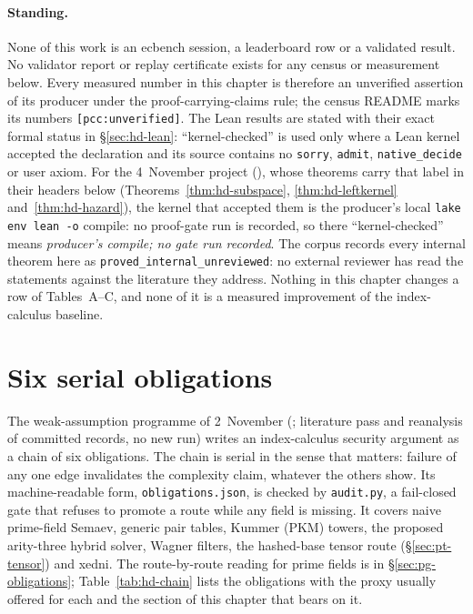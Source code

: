 \paragraph{Standing.} None of this work is an ecbench session, a leaderboard
row or a validated result. No validator report or replay certificate exists
for any census or measurement below. Every measured number in this chapter
is therefore an unverified assertion of its producer under the
proof-carrying-claims rule; the census README marks its numbers
\texttt{[pcc:unverified]}. The Lean results are stated with their exact
formal status in \S\ref{sec:hd-lean}: ``kernel-checked'' is used only where
a Lean kernel accepted the declaration and its source contains no
\texttt{sorry}, \texttt{admit}, \texttt{native\_decide} or user axiom. For the
4~November project (), whose theorems
carry that label in their headers below (Theorems~\ref{thm:hd-subspace},
\ref{thm:hd-leftkernel} and~\ref{thm:hd-hazard}), the kernel that accepted
them is the producer's local \texttt{lake env lean -o} compile: no
proof-gate run is recorded, so there ``kernel-checked'' means
\emph{producer's compile; no gate run recorded}. The
corpus records every internal theorem here as
\texttt{proved\_internal\_unreviewed}: no external reviewer has read the
statements against the literature they address. Nothing in this chapter
changes a row of Tables~A--C, and none of it is a measured improvement of the
index-calculus baseline.

\section{Six serial obligations}\label{sec:hd-chain}

The weak-assumption programme of 2~November
(; literature pass and
reanalysis of committed records, no new run) writes an index-calculus
security argument as a chain of six obligations. The chain is serial in the
sense that matters: failure of any one edge invalidates the complexity
claim, whatever the others show. Its machine-readable form,
\texttt{obligations.json}, is checked by \texttt{audit.py}, a fail-closed
gate that refuses to promote a route while any field is missing. It covers
naive prime-field Semaev, generic pair tables, Kummer (PKM) towers, the
proposed arity-three hybrid solver, Wagner filters, the hashed-base tensor
route (\S\ref{sec:pt-tensor}) and xedni. The route-by-route reading for prime
fields is in \S\ref{sec:pg-obligations}; Table~\ref{tab:hd-chain} lists the
obligations with the proxy usually offered for each and the section of this
chapter that bears on it.

